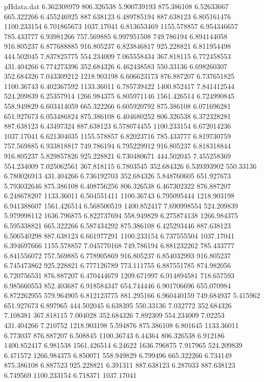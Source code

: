 \begin{filecontents}{pHdata.dat}
6.362308979	806.326538
5.900739193	875.386108
6.52633667	665.322266
6.455246925	887.638123
6.489785194	887.638123
6.805161476	1100.233154
6.701865673	1037.17041
6.813653469	1155.578857
6.954346657	785.433777
6.93981266	757.569885
6.997951508	749.786194
6.894144058	916.805237
6.877688885	916.805237
6.823846817	925.228821
6.811954498	444.502045
7.837825775	554.234009
7.065558434	367.818115
6.772458553	431.404266
6.774273396	352.684326
6.462438583	550.33136
6.698260307	352.684326
7.043309212	1218.903198
6.606623173	876.887207
6.737651825	1100.36743
6.402367592	1133.36011
6.785739422	1400.852417
7.841412544	524.209839
6.25357914	1266.984375
6.805971146	1561.426514
6.724990845	558.949829
6.603414059	665.322266
6.605920792	875.386108
6.071696281	651.927673
6.053486824	875.386108
6.404680252	806.326538
6.372328281	887.638123
6.43497324	887.638123
6.578074455	1100.233154
6.672014236	1037.17041
6.621304035	1155.578857
6.82023716	785.433777
6.819730759	757.569885
6.933818817	749.786194
6.795229912	916.805237
6.818318844	916.805237
5.829857826	925.228821
6.730480671	444.502045
7.455258369	554.234009
7.025062561	367.818115
6.7803545	352.684326
6.539393902	550.33136
6.780026913	431.404266
6.736192703	352.684326
5.848760605	651.927673
5.793032646	875.386108
6.408756256	806.326538
6.467302322	876.887207
6.248678207	1133.36011
6.504551411	1100.36743
6.795095444	1218.903198
6.941388607	1561.426514
6.568500519	1400.852417
7.690998554	524.209839
5.979998112	1636.796875
6.822737694	558.949829
6.275874138	1266.984375
6.595338821	665.322266
6.587434292	875.386108
6.425293446	887.638123
6.506540298	887.638123
6.661977291	1100.233154
6.737555504	1037.17041
6.394697666	1155.578857
7.045770168	749.786194
6.881232262	785.433777
6.841556072	757.569885
6.778905869	916.805237
6.854032993	916.805237
6.745473862	925.228821
6.777126789	773.111755
6.887551785	874.982056
6.720756531	876.887207
6.470444679	1209.671997
6.914894581	718.657593
6.985660553	852.403687
6.918584347	654.744446
6.901706696	655.070984
6.872262955	579.964905
6.812123775	881.295166
6.960440159	749.684937
5.415962	651.927673
6.897965	444.502045
6.638395	550.33136
7.032772	352.684326
7.108381	367.818115
7.004028	352.684326
7.892309	554.234009
7.02253	431.404266
7.210752	1218.903198
5.594876	875.386108
6.801645	1133.36011
6.773037	876.887207
6.508845	1100.36743
6.44364	806.326538
6.912186	1400.852417
6.981538	1561.426514
6.24622	1636.796875
7.917965	524.209839
6.471572	1266.984375
6.850071	558.949829
6.799496	665.322266
6.734149	875.386108
6.887523	925.228821
6.391311	887.638123
6.287033	887.638123
6.749569	1100.233154
6.718371	1037.17041

\end{filecontents}
